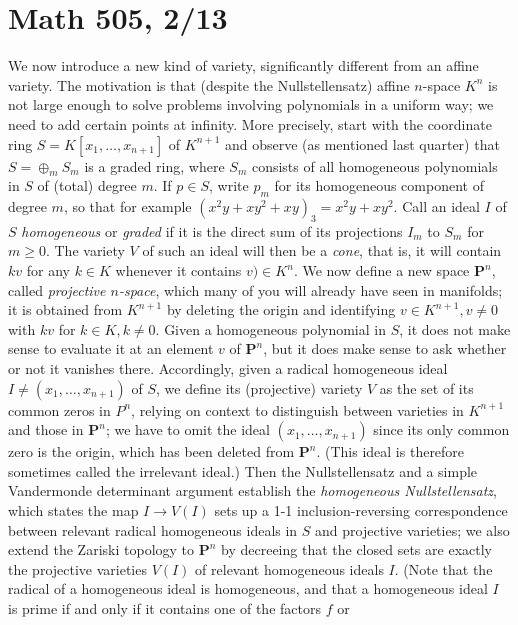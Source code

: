 \documentclass[10pt]{article}
\begin{document}
\section*{Math 505, 2/13}

We now introduce a new kind of variety, significantly different from an
affine variety. The motivation is that (despite the Nullstellensatz)
affine $n$-space $K^n$ is not large enough to solve problems involving
polynomials in a uniform way; we need to add certain points at infinity.
More precisely, start with the coordinate ring $S =
K[x_1,\ldots,x_{n+1}]$ of $K^{n+1}$ and observe (as mentioned last
quarter) that $S = \oplus_m S_m$ is a graded ring, where $S_m$ consists
of all homogeneous polynomials in $S$ of (total) degree $m$. If $p\in
S$, write $p_m$ for its homogeneous component of degree $m$, so that for
example $(x^2 y + x y^2 + xy)_3 = x^2 y + x y^2$. Call an ideal $I$ of
$S$ {\sl homogeneous} or {\sl graded} if it is the direct sum of its
projections $I_m$ to $S_m$ for $m\ge0$. The variety $V$ of such an ideal
will then be a {\sl cone}, that is, it will contain $kv$ for any $k\in
K$ whenever it contains $v)\in K^n$. We now define a new space $\mathbf
P^n$, called {\sl projective $n$-space}, which many of you will already
have seen in manifolds; it is obtained from $K^{n+1}$ by deleting the
origin and identifying $v\in K^{n+1},v\ne0$ with $kv$ for $k\in
K,k\ne0$. Given a homogeneous polynomial in $S$, it does not make sense
to evaluate it at an element $v$ of $\mathbf P^n$, but it does make
sense to ask whether or not it vanishes there. Accordingly, given a
radical homogeneous ideal $I\ne(x_1,\ldots,x_{n+1})$ of $S$, we define
its (projective) variety $V$ as the set of its common zeros in $P^n$,
relying on context to distinguish between varieties in $K^{n+1}$ and
those in $\mathbf P^n$; we have to omit the ideal $(x_1,\ldots,x_{n+1})$
since its only common zero is the origin, which has been deleted from
$\mathbf P^n$. (This ideal is therefore sometimes called the irrelevant
ideal.) Then the Nullstellensatz and a simple Vandermonde determinant
argument establish the {\sl homogeneous Nullstellensatz}, which states
the map $I\rightarrow V(I)$ sets up a 1-1 inclusion-reversing
correspondence between relevant radical homogeneous ideals in $S$ and
projective varieties; we also extend the Zariski topology to $\mathbf
P^n$ by decreeing that the closed sets are exactly the projective
varieties $V(I)$ of relevant homogeneous ideals $I$. (Note that the
radical of a homogeneous ideal is homogeneous, and that a homogeneous
ideal $I$ is prime if and only if it contains one of the factors $f$ or
\end{document}
